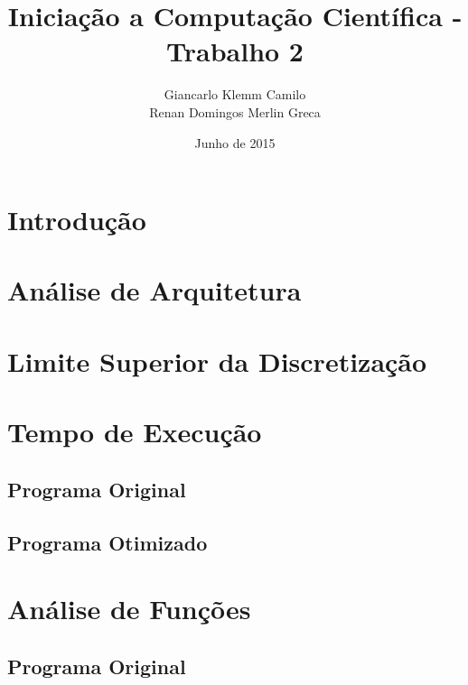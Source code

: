\documentclass[12pt]{article}
\title{Iniciação a Computação Científica - Trabalho 2}
\author{
	Giancarlo Klemm Camilo \\
	Renan Domingos Merlin Greca
}
\date{Junho de 2015}
\begin{document}
\maketitle
\newpage	

\tableofcontents
\newpage

\section{Introdução}

\newpage

\section{Análise de Arquitetura}

\newpage

\section{Limite Superior da Discretização}

\newpage

\section{Tempo de Execução}

	\subsection{Programa Original}
	\subsection{Programa Otimizado}
\newpage

\section{Análise de Funções}

	\subsection{Programa Original}
\end{document}
